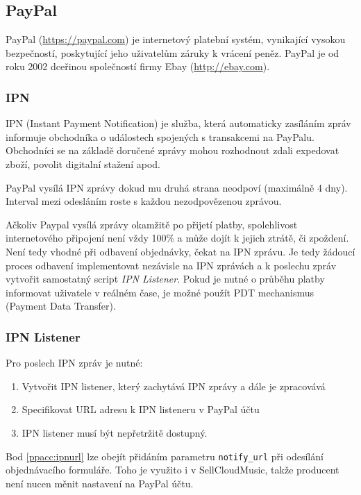 \documentclass[12pt]{article}
\begin{document}
\subsection{PayPal}

PayPal (\url{https://paypal.com}) je internetový platební systém, vynikající vysokou bezpečností, poskytující jeho uživatelům záruky k vrácení peněz.
PayPal je od roku 2002 dceřinou společností firmy Ebay (\url{http://ebay.com}).

\subsubsection{IPN}

IPN (Instant Payment Notification) je služba, která automaticky zasíláním zpráv informuje obchodníka o událostech spojených s transakcemi na PayPalu. Obchodníci se na základě doručené zprávy mohou rozhodnout zdali expedovat zboží, povolit digitalní stažení apod. 

PayPal vysílá IPN zprávy dokud mu druhá strana neodpoví (maximálně 4 dny). Interval mezi odesláním roste s každou nezodpovězenou zprávou.

Ačkoliv Paypal vysílá zprávy okamžitě po přijetí platby, spolehlivost internetového připojení není vždy 100\% a může dojít k jejich ztrátě, či zpoždení. Není tedy vhodné při odbavení objednávky, čekat na IPN zprávu. Je tedy žádoucí proces odbavení implementovat nezávisle na IPN zprávách a k poslechu zpráv vytvořit samostatný script \emph{IPN Listener}. Pokud je nutné o průběhu platby informovat uživatele v reálném čase, je možné použít PDT mechanismus (Payment Data Transfer\cite{ppdocs}).

\subsubsection{IPN Listener}

Pro poslech IPN zpráv je nutné:

\begin{enumerate}
\item Vytvořit IPN listener, který zachytává IPN zprávy a dále je zpracovává
\item \label{ppacc:ipnurl} Specifikovat URL adresu k IPN listeneru v PayPal účtu
\item IPN listener musí být nepřetržitě dostupný.
\end{enumerate}

Bod \ref{ppacc:ipnurl} lze obejít přidáním parametru \texttt{notify\_url} při odesílání objednávacího formuláře. Toho je využito i v SellCloudMusic, takže producent není nucen měnit nastavení na PayPal účtu.\newline
\end{document}

